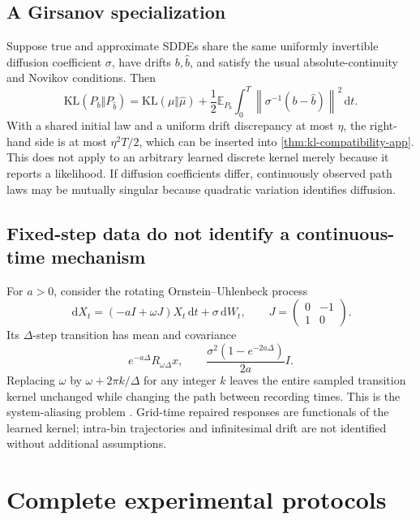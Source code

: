 \documentclass{article}
\newcommand{\E}{\mathbb E}
\newcommand{\KL}{\mathrm{KL}}
\newcommand{\dd}{\,\mathrm d}
\theoremstyle{remark}
\begin{document}
\subsection{A Girsanov specialization}

Suppose true and approximate SDDEs share the same uniformly invertible
diffusion coefficient \(\sigma\), have drifts \(b,\widehat b\), and satisfy the
usual absolute-continuity and Novikov conditions. Then
\begin{equation}
  \KL(P_b\Vert P_{\widehat b})
  =
  \KL(\mu\Vert\widehat\mu)
  +
  \frac12
  \E_{P_b}
  \int_0^T
  \left\|
    \sigma^{-1}(b-\widehat b)
  \right\|^2
  \dd t.
  \label{eq:girsanov-app}
\end{equation}
With a shared initial law and a uniform drift discrepancy at most \(\eta\), the
right-hand side is at most \(\eta^2T/2\), which can be inserted into
\cref{thm:kl-compatibility-app}. This does not apply to an arbitrary learned
discrete kernel merely because it reports a likelihood. If diffusion
coefficients differ, continuously observed path laws may be mutually singular
because quadratic variation identifies diffusion.

\subsection{Fixed-step data do not identify a continuous-time mechanism}

For \(a>0\), consider the rotating Ornstein--Uhlenbeck process
\[
  \dd X_t
  =
  (-aI+\omega J)X_t\dd t+\sigma\dd W_t,
  \qquad
  J=
  \begin{pmatrix}
  0&-1\\1&0
  \end{pmatrix}.
\]
Its \(\Delta\)-step transition has mean and covariance
\[
  e^{-a\Delta}R_{\omega\Delta}x,
  \qquad
  \frac{\sigma^2(1-e^{-2a\Delta})}{2a}I.
\]
Replacing \(\omega\) by \(\omega+2\pi k/\Delta\) for any integer \(k\) leaves
the entire sampled transition kernel unchanged while changing the path between
recording times. This is the system-aliasing problem
\citep{yue2016aliasing}. Grid-time repaired responses are functionals of the
learned kernel; intra-bin trajectories and infinitesimal drift are not
identified without additional assumptions.

\section{Complete experimental protocols}
\label{app:experiments}
\end{document}
